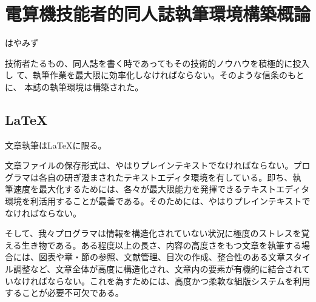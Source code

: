 
\chapter{電算機技能者的同人誌執筆環境構築概論}

\begin{flushright}
 はやみず
\end{flushright}

\lettrine{技}
術者たるもの、同人誌を書く時であってもその技術的ノウハウを積極的に投入し
て、執筆作業を最大限に効率化しなければならない。そのような信条のもとに、
本誌の執筆環境は構築された。

% 

\section{LaTeX}

文章執筆はLaTeXに限る。


文章ファイルの保存形式は、やはりプレインテキストでなければならない。プロ
グラマは各自の研ぎ澄まされたテキストエディタ環境を有している。即ち、執
筆速度を最大化するためには、各々が最大限能力を発揮できるテキストエディタ
環境を利活用することが最善である。そのためには、やはりプレインテキストで
なければならない。

そして、我々プログラマは情報を構造化されていない状況に極度のストレスを覚
える生き物である。ある程度以上の長さ、内容の高度さをもつ文章を執筆する場
合には、図表や章・節の参照、文献管理、目次の作成、整合性のある文章スタイ
ル調整など、文章全体が高度に構造化され、文章内の要素が有機的に結合されて
いなければならない。これを為すためには、高度かつ柔軟な組版システムを利用
することが必要不可欠である。

